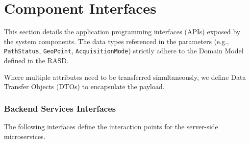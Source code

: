 \section{Component Interfaces}
This section details the application programming interfaces (APIs) exposed by the system components. The data types referenced in the parameters (e.g., \texttt{PathStatus}, \texttt{GeoPoint}, \texttt{AcquisitionMode}) strictly adhere to the Domain Model defined in the RASD.

Where multiple attributes need to be transferred simultaneously, we define Data Transfer Objects (DTOs) to encapsulate the payload.

\subsubsection{Backend Services Interfaces}
The following interfaces define the interaction points for the server-side microservices.

